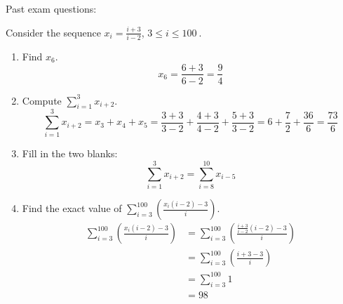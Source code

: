 \documentclass[12pt,twoside]{article}
\newcommand{\dsst}{\displaystyle}
\begin{document}
Past exam questions: 

Consider the sequence $x_i = \dsst\frac{i+3}{i-2}$, $3\leq i \leq 100\
$.

\begin{enumerate}
  \item Find $x_6$.\\
$$ x_6 = \frac{6+3}{6-2} = \frac{9}{4} $$

  \item Compute $\dsst\sum_{i=1}^3 x_{i+2}$.
$$ \sum_{i=1}^3 x_{i+2} = x_3 + x_4 + x_5 =  \frac{3+3}{3-2} +  \frac{4+3}{4-2} +  \frac{5+3}{3-2} = 6 + \frac{7}{2} + \frac{36}{6} = \frac{73}{6} $$

  \item Fill in the two blanks: $$\dsst\sum_{i=1}^3 x_{i+2} = \dsst\sum_{i=8}^{10} x_{i-5}$$

  \item Find the exact value of $\dsst\sum_{i=3}^{100} \left(\frac{x_i(i-2)-3}{i}\right)$.
\begin{align*}
\sum_{i=3}^{100} \left(\frac{x_i(i-2)-3}{i}\right) & = \sum_{i=3}^{100} \left(\frac{\frac{i+3}{i-2}(i-2)-3}{i}\right) \\
& = \sum_{i=3}^{100} \left(\frac{i+3-3}{i}\right) \\
& = \sum_{i=3}^{100} 1 \\
& = 98 
\end{align*}

\end{enumerate}
\end{document}

